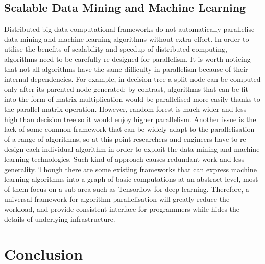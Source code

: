\documentclass[conference]{IEEEtran}
\begin{document}
\hypertarget{scalable-data-mining-and-machine-learning-1}{%
\subsection{Scalable Data Mining and Machine
Learning}\label{scalable-data-mining-and-machine-learning-1}}

Distributed big data computational frameworks do not automatically
parallelise data mining and machine learning algorithms without extra
effort. In order to utilise the benefits of scalability and speedup of
distributed computing, algorithms need to be carefully re-designed for
parallelism. It is worth noticing that not all algorithms have the same
difficulty in parallelism because of their internal dependencies. For
example, in decision tree a split node can be computed only after its
parented node generated; by contrast, algorithms that can be fit into
the form of matrix multiplication would be parallelised more easily
thanks to the parallel matrix operation. However, random forest is much
wider and less high than decision tree so it would enjoy higher
parallelism. Another issue is the lack of some common framework that can
be widely adapt to the parallelisation of a range of algorithms, so at
this point researchers and engineers have to re-design each individual
algorithm in order to exploit the data mining and machine learning
technologies. Such kind of approach causes redundant work and less
generality. Though there are some existing frameworks that can express
machine learning algorithms into a graph of basic computations at an
abstract level, most of them focus on a sub-area such as Tensorflow for
deep learning. Therefore, a universal framework for algorithm
parallelisation will greatly reduce the workload, and provide consistent
interface for programmers while hides the details of underlying
infrastructure.

\hypertarget{conclusion}{%
\section{Conclusion}\label{conclusion}}
\end{document}
